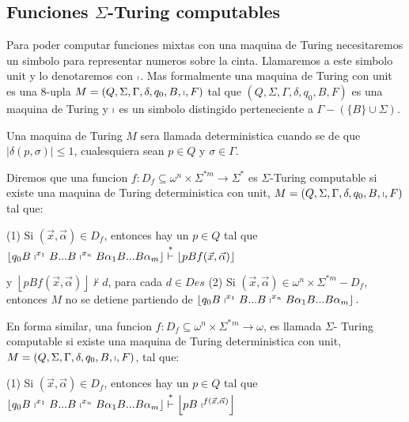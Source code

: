 \subsection{Funciones \(\Sigma \)-Turing computables}

Para poder computar funciones mixtas con una maquina de Turing necesitaremos un simbolo para representar numeros sobre la cinta. Llamaremos a este simbolo unit y lo denotaremos con \(\shortmid \). Mas formalmente una maquina de Turing con unit es una 8-upla \(M=\left( Q,\Sigma ,\Gamma ,\delta ,q_{0},B,\shortmid ,F\right) \) tal que \(\left( Q,\Sigma ,\Gamma ,\delta ,q_{0},B,F\right) \) es una maquina de Turing y \(\shortmid \) es un simbolo distingido perteneciente a \(\Gamma -(\{B\}\cup \Sigma )\).

Una maquina de Turing \(M\) sera llamada deterministica cuando se de que \(\left\vert \delta (p,\sigma )\right\vert \leq 1\), cualesquiera sean \( p\in Q\) y \(\sigma \in \Gamma \).

Diremos que una funcion \(f:D_{f}\subseteq \omega ^{n}\times \Sigma ^{\ast m}\rightarrow \Sigma ^{\ast }\) es \(\Sigma \)-Turing computable si existe una maquina de Turing deterministica con unit, \(M=\left( Q,\Sigma ,\Gamma ,\delta ,q_{0},B,\shortmid ,F\right) \) tal que:

(1) Si \((\vec{x},\vec{\alpha})\in D_{f}\), entonces hay un \(p\in Q\) tal que
\(\displaystyle \left\lfloor q_{0}B\shortmid ^{x_{1}}B...B\shortmid ^{x_{n}}B\alpha _{1}B...B\alpha _{m}\right\rfloor \overset{\ast }{\vdash }\left\lfloor pBf( \vec{x},\vec{\alpha})\right\rfloor \)

y \(\left\lfloor pBf(\vec{x},\vec{\alpha})\right\rfloor \nvdash d\), para cada \(d\in Des\)
(2) Si \((\vec{x},\vec{\alpha})\in \omega ^{n}\times \Sigma ^{\ast m}-D_{f}\), entonces \(M\) no se detiene partiendo de
\(\displaystyle \left\lfloor q_{0}B\shortmid ^{x_{1}}B...B\shortmid ^{x_{n}}B\alpha _{1}B...B\alpha _{m}\right\rfloor . \)

En forma similar, una funcion \(f:D_{f}\subseteq \omega ^{n}\times \Sigma ^{\ast }{}^{m}\rightarrow \omega \), es llamada \(\Sigma \)- Turing computable si existe una maquina de Turing deterministica con unit, \( M=\left( Q,\Sigma ,\Gamma ,\delta ,q_{0},B,\shortmid ,F\right) \), tal que:

(1) Si \((\vec{x},\vec{\alpha})\in D_{f}\), entonces hay un \(p\in Q\) tal que
\(\displaystyle \left\lfloor q_{0}B\shortmid ^{x_{1}}B...B\shortmid ^{x_{n}}B\alpha _{1}B...B\alpha _{m}\right\rfloor \overset{\ast }{\vdash }\left\lfloor pB\shortmid ^{f(\vec{x},\vec{\alpha})}\right\rfloor \)

